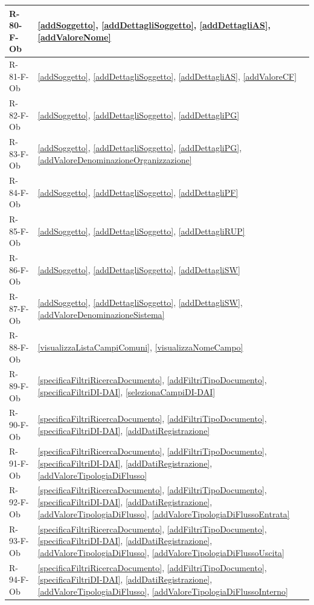 \begin{longtable}{|p{4cm}|p{10cm}|}
\hline
R-80-F-Ob & \ref{addSoggetto}, \ref{addDettagliSoggetto}, \ref{addDettagliAS}, \ref{addValoreNome} \\
\hline
R-81-F-Ob & \ref{addSoggetto}, \ref{addDettagliSoggetto}, \ref{addDettagliAS}, \ref{addValoreCF} \\
\hline
R-82-F-Ob & \ref{addSoggetto}, \ref{addDettagliSoggetto}, \ref{addDettagliPG} \\
\hline
R-83-F-Ob & \ref{addSoggetto}, \ref{addDettagliSoggetto}, \ref{addDettagliPG}, \ref{addValoreDenominazioneOrganizzazione} \\
\hline
R-84-F-Ob & \ref{addSoggetto}, \ref{addDettagliSoggetto}, \ref{addDettagliPF} \\
\hline
R-85-F-Ob & \ref{addSoggetto}, \ref{addDettagliSoggetto}, \ref{addDettagliRUP} \\
\hline
R-86-F-Ob & \ref{addSoggetto}, \ref{addDettagliSoggetto}, \ref{addDettagliSW} \\
\hline
R-87-F-Ob & \ref{addSoggetto}, \ref{addDettagliSoggetto}, \ref{addDettagliSW}, \ref{addValoreDenominazioneSistema} \\
\hline
R-88-F-Ob & \ref{visualizzaListaCampiComuni}, \ref{visualizzaNomeCampo} \\
\hline
R-89-F-Ob & \ref{specificaFiltriRicercaDocumento}, \ref{addFiltriTipoDocumento}, \ref{specificaFiltriDI-DAI}, \ref{selezionaCampiDI-DAI} \\
\hline
R-90-F-Ob & \ref{specificaFiltriRicercaDocumento}, \ref{addFiltriTipoDocumento}, \ref{specificaFiltriDI-DAI}, \ref{addDatiRegistrazione} \\
\hline
R-91-F-Ob & \ref{specificaFiltriRicercaDocumento}, \ref{addFiltriTipoDocumento}, \ref{specificaFiltriDI-DAI}, \ref{addDatiRegistrazione}, \ref{addValoreTipologiaDiFlusso} \\
\hline
R-92-F-Ob & \ref{specificaFiltriRicercaDocumento}, \ref{addFiltriTipoDocumento}, \ref{specificaFiltriDI-DAI}, \ref{addDatiRegistrazione}, \ref{addValoreTipologiaDiFlusso}, \ref{addValoreTipologiaDiFlussoEntrata} \\
\hline
R-93-F-Ob & \ref{specificaFiltriRicercaDocumento}, \ref{addFiltriTipoDocumento}, \ref{specificaFiltriDI-DAI}, \ref{addDatiRegistrazione}, \ref{addValoreTipologiaDiFlusso}, \ref{addValoreTipologiaDiFlussoUscita} \\
\hline
R-94-F-Ob & \ref{specificaFiltriRicercaDocumento}, \ref{addFiltriTipoDocumento}, \ref{specificaFiltriDI-DAI}, \ref{addDatiRegistrazione}, \ref{addValoreTipologiaDiFlusso}, \ref{addValoreTipologiaDiFlussoInterno} \\

\end{longtable}
